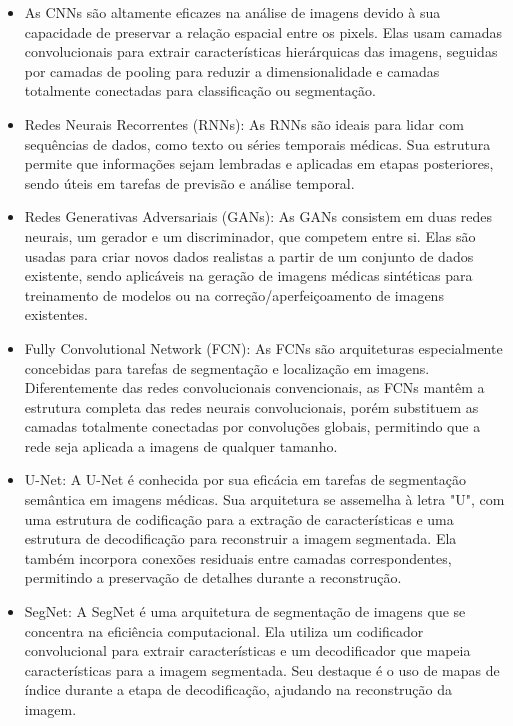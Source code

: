 \begin{itemize}

    \item As \ac{CNNs} são altamente eficazes na análise de imagens devido à sua capacidade de preservar a relação espacial entre os pixels. Elas usam camadas convolucionais para extrair características hierárquicas das imagens, seguidas por camadas de pooling para reduzir a dimensionalidade e camadas totalmente conectadas para classificação ou segmentação.

    \item Redes Neurais Recorrentes (RNNs): As RNNs são ideais para lidar com sequências de dados, como texto ou séries temporais médicas. Sua estrutura permite que informações sejam lembradas e aplicadas em etapas posteriores, sendo úteis em tarefas de previsão e análise temporal.

    \item Redes Generativas Adversariais (GANs): As GANs consistem em duas redes neurais, um gerador e um discriminador, que competem entre si. Elas são usadas para criar novos dados realistas a partir de um conjunto de dados existente, sendo aplicáveis na geração de imagens médicas sintéticas para treinamento de modelos ou na correção/aperfeiçoamento de imagens existentes.

    \item Fully Convolutional Network (\ac{FCN}): As \ac{FCN}s são arquiteturas especialmente concebidas para tarefas de segmentação e localização em imagens. Diferentemente das redes convolucionais convencionais, as \ac{FCN}s mantêm a estrutura completa das redes neurais convolucionais, porém substituem as camadas totalmente conectadas por convoluções globais, permitindo que a rede seja aplicada a imagens de qualquer tamanho.

    \item \ac{U-Net}: A \ac{U-Net} é conhecida por sua eficácia em tarefas de segmentação semântica em imagens médicas. Sua arquitetura se assemelha à letra "U", com uma estrutura de codificação para a extração de características e uma estrutura de decodificação para reconstruir a imagem segmentada. Ela também incorpora conexões residuais entre camadas correspondentes, permitindo a preservação de detalhes durante a reconstrução.

    \item \ac{SegNet}: A \ac{SegNet} é uma arquitetura de segmentação de imagens que se concentra na eficiência computacional. Ela utiliza um codificador convolucional para extrair características e um decodificador que mapeia características para a imagem segmentada. Seu destaque é o uso de mapas de índice durante a etapa de decodificação, ajudando na reconstrução da imagem.


\end{itemize}
